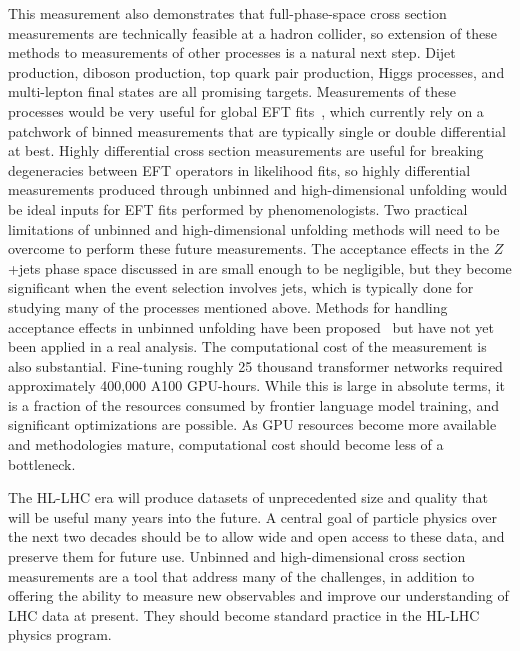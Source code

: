 This measurement also demonstrates that full-phase-space cross section measurements are technically feasible at a hadron collider, so extension of these methods to measurements of other processes is a natural next step.
Dijet production, diboson production, top quark pair production, Higgs processes, and multi-lepton final states are all promising targets.
Measurements of these processes would be very useful for global EFT fits~\cite{CMS:2023xyc,CMS:2025ugn,Heimel:2024drk}, which currently rely on a patchwork of binned measurements that are typically single or double differential at best.
Highly differential cross section measurements are useful for breaking degeneracies between EFT operators in likelihood fits, so highly differential measurements produced through unbinned and high-dimensional unfolding would be ideal inputs for EFT fits performed by phenomenologists.
Two practical limitations of unbinned and high-dimensional unfolding methods will need to be overcome to perform these future measurements.
The acceptance effects in the $Z$+jets phase space discussed in  are small enough to be negligible, but they become significant when the event selection involves jets, which is typically done for studying many of the processes mentioned above.
Methods for handling acceptance effects in unbinned unfolding have been proposed~\cite{Butter:2025mek,Canelli:2025ybb} but have not yet been applied in a real analysis.
The computational cost of the measurement is also substantial.
Fine-tuning roughly 25 thousand transformer networks required approximately 400,000 A100 GPU-hours.
While this is large in absolute terms, it is a fraction of the resources consumed by frontier language model training, and significant optimizations are possible.
As GPU resources become more available and methodologies mature, computational cost should become less of a bottleneck.

The HL-LHC era will produce datasets of unprecedented size and quality that will be useful many years into the future.
A central goal of particle physics over the next two decades should be to allow wide and open access to these data, and preserve them for future use.
Unbinned and high-dimensional cross section measurements are a tool that address many of the challenges, in addition to offering the ability to measure new observables and improve our understanding of LHC data at present.
They should become standard practice in the HL-LHC physics program.

\FloatBarrier
